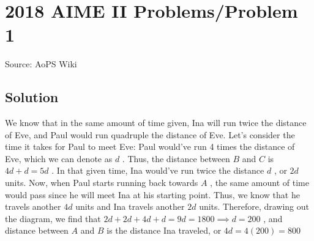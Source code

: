 \documentclass[12pt]{article}
\begin{document}
\section*{{2018 AIME II Problems/Problem 1}}
Source: AoPS Wiki

\subsection*{Solution}
We know that in the same amount of time given, Ina will run twice the distance of Eve, and Paul would run quadruple the distance of Eve. Let's consider the time it takes for Paul to meet Eve: Paul would've run 4 times the distance of Eve, which we can denote as $d$ . Thus, the distance between $B$ and $C$ is $4d+d=5d$ . In that given time, Ina would've run twice the distance $d$ , or $2d$ units. Now, when Paul starts running back towards $A$ , the same amount of time would pass since he will meet Ina at his starting point. Thus, we know that he travels another $4d$ units and Ina travels another $2d$ units. Therefore, drawing out the diagram, we find that $2d+2d+4d+d=9d=1800 \implies d=200$ , and distance between $A$ and $B$ is the distance Ina traveled, or $4d=4(200)=\boxed{800}$
\end{document}
